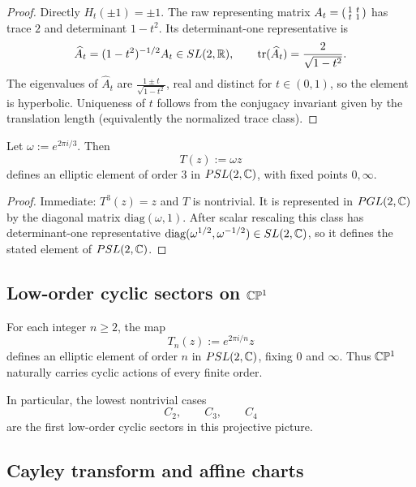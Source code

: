 \documentclass[11pt]{article}
\begin{document}
\begin{proof}
Directly $H_t(\pm 1)=\pm 1$. The raw representing matrix
$A_t=\begin{psmallmatrix}1&t\\ t&1\end{psmallmatrix}$ has trace $2$ and
determinant $1-t^2$.  Its determinant-one representative is
\[
    \widehat A_t=(1-t^2)^{-1/2}A_t\in SL(2,\mathbb{R}),
    \qquad
    \operatorname{tr}(\widehat A_t)=\frac{2}{\sqrt{1-t^2}}.
\]
The eigenvalues of \(\widehat A_t\) are
$\frac{1\pm t}{\sqrt{1-t^2}}$, real and distinct for $t\in(0,1)$, so the element is hyperbolic. Uniqueness
of $t$ follows from the conjugacy invariant given by the translation length (equivalently the normalized trace class).
\end{proof}

\begin{theorem}
\label{p1:thm:z3-elliptic}
Let $\omega:=e^{2\pi i/3}$. Then
\begin{equation}
\label{p1:eq:T_z3-geom}
T(z):=\omega z
\end{equation}
defines an elliptic element of order $3$ in $PSL(2,\mathbb{C})$, with fixed points $0,\infty$.
\end{theorem}

\begin{proof}
Immediate: $T^3(z)=z$ and $T$ is nontrivial. It is represented in $PGL(2,\mathbb{C})$ by the diagonal matrix
$\mathrm{diag}(\omega,1)$. After scalar rescaling this class has determinant-one representative
$\mathrm{diag}(\omega^{1/2},\omega^{-1/2})\in SL(2,\mathbb{C})$, so it defines the stated element of $PSL(2,\mathbb{C})$.
\end{proof}


\subsection{Low-order cyclic sectors on \texorpdfstring{$\mathbb{C}\mathbb{P}^1$}{CP1}}
\label{p1:subsec:low-order-cyclic}

For each integer \(n\ge 2\), the map
\[
T_n(z):=e^{2\pi i/n}z
\]
defines an elliptic element of order \(n\) in \(PSL(2,\mathbb{C})\), fixing \(0\) and \(\infty\).
Thus \(\mathbb{C}\mathbb{P}^1\) naturally carries cyclic actions of every finite order.

In particular, the lowest nontrivial cases
\[
C_2,\qquad C_3,\qquad C_4
\]
are the first low-order cyclic sectors in this projective picture.


\subsection{Cayley transform and affine charts}
\label{p1:subsec:cayley-affine}
\end{document}
